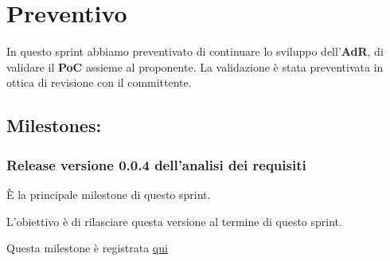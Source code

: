 \section{Preventivo}

In questo sprint abbiamo preventivato di continuare lo sviluppo dell'\textbf{AdR}, di validare il \textbf{PoC} assieme al proponente. La validazione è stata preventivata in ottica di revisione con il committente.

\subsection{Milestones:}  
\subsubsection{Release versione 0.0.4 dell'analisi dei requisiti}

È la principale milestone di questo sprint.

L'obiettivo è di rilasciare questa versione al termine di questo sprint.

Questa milestone è registrata \href{https://github.com/SWEasabi/analisi-dei-requisiti/milestone/4}{qui}